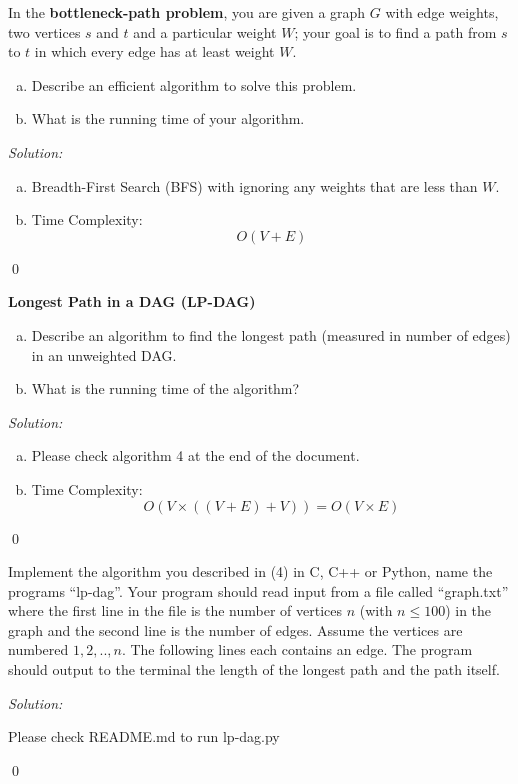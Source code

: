 \documentclass[12pt]{article}
\newenvironment{problem}[2][Problem]{\begin{trivlist}
\item[\hskip \labelsep {\bfseries #1}\hskip \labelsep {\bfseries #2.}]}{\end{trivlist}}
\newenvironment{sol}
    {\emph{Solution:}
    }
    {
    \qed
    }
\begin{document}
\begin{problem}{3} In the \textbf{bottleneck-path problem}, you are given a graph $G$ with edge weights, two vertices $s$ and $t$ and a particular weight $W$; your goal is to find a path from $s$ to $t$ in which every edge has at least weight $W$.

\begin{enumerate}[(a)]
    \item Describe an efficient algorithm to solve this problem. 
    \item What is the running time of your algorithm.
\end{enumerate}
\end{problem}
\begin{sol}
\begin{enumerate}[(a)]
    \item Breadth-First Search (BFS) with ignoring any weights that are less than $W$.
    \item Time Complexity: $$O(V+E)$$
\end{enumerate}
\end{sol}

\begin{problem}{4} \textbf{Longest Path in a DAG (LP-DAG)}

\begin{enumerate}[(a)]
    \item Describe an algorithm to find the longest path (measured in number of edges) in an unweighted DAG.
    \item What is the running time of the algorithm?
\end{enumerate}
\end{problem}
\begin{sol}
\begin{enumerate}[(a)]
    \item Please check algorithm 4 at the end of the document.
    \item Time Complexity: $$O(V \times ((V + E) + V)) = O(V \times E)$$
\end{enumerate}
\end{sol}

\begin{problem}{5}  Implement the algorithm you described in (4) in C, C++ or Python, name the programs “lp-dag”. Your program should read input from a file called “graph.txt” where the first line in the file is the number of vertices $n$ (with $n \leq 100$) in the graph and the second line is the number of edges. Assume the vertices are numbered $1,2, .., n$. The following lines each contains an edge. The program should output to the terminal the length of the longest path and the path itself.
\end{problem}
\begin{sol}
Please check README.md to run lp-dag.py
\end{sol}
\newpage
\end{document}
